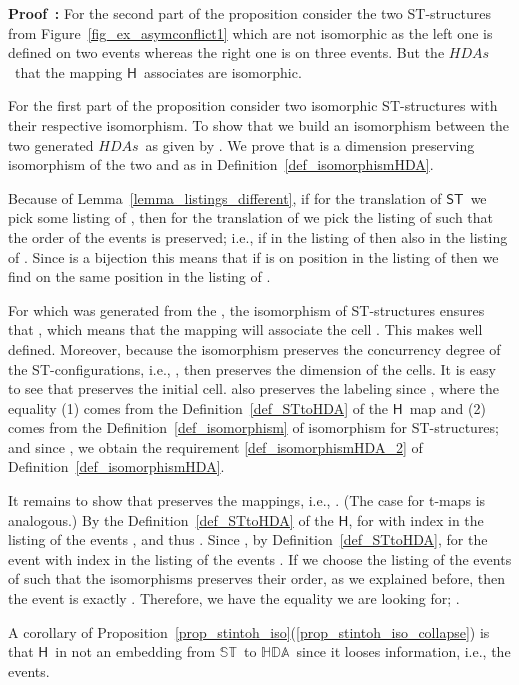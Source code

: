 \documentclass[submission,copyright,creativecommons]{eptcs}
\newenvironment{proof}[1][\!\!\,]{\vspace{1ex}\noindent\textbf{Proof #1: }}{\hfill\vspace{2ex}}
\newcommand{\refeq}[1]{(\ref{#1})}
\newcounter{case}
\newcommand\HDAs{\ensuremath{\mathit{HDAs}}}
\newcommand\ST{\ensuremath{\mathsf{ST}}}
\newcommand\allST{\ensuremath{\mathbb{ST}}}
\newcommand\allHDA{\ensuremath{\mathbb{HDA}}}
\newcommand\stintoh{\ensuremath{\mathsf{H}}}
\begin{document}
\begin{proof}
For the second part of the proposition consider the two ST-structures from Figure~\ref{fig_ex_asymconflict1} which are not isomorphic as the left one is defined on two events whereas the right one is on three events. But the \HDAs\ that the mapping \stintoh\ associates are isomorphic.

\vspace{1ex}
For the first part of the proposition consider two isomorphic ST-structures  with  their respective isomorphism. To show that  we build an isomorphism between the two generated \HDAs\ as  given by . We prove that  is a dimension preserving isomorphism of the two  and  as in Definition~\ref{def_isomorphismHDA}.

Because of Lemma~\ref{lemma_listings_different}, if for the translation of \ST\ we pick some listing of , then for the translation of  we pick the listing of  such that the order of the events is preserved; i.e., if  in the listing of  then also  in the listing of . Since  is a bijection this means that if  is on position  in the listing of  then  we find  on the same position  in the listing of .

For  which was generated from the , the isomorphism of ST-structures ensures that , which means that the mapping will associate the cell . This makes  well defined. Moreover, because the isomorphism  preserves the concurrency degree of the ST-configurations, i.e., , then  preserves the dimension of the cells.
It is easy to see that  preserves the initial cell.
 also preserves the labeling since , where the equality (1) comes from the Definition~\ref{def_STtoHDA} of the \stintoh\ map and (2) comes from the Definition~\ref{def_isomorphism} of isomorphism for ST-structures; and since , we obtain the requirement \ref{def_isomorphismHDA_2} of Definition~\ref{def_isomorphismHDA}.

It remains to show that  preserves the mappings, i.e., . (The case for t-maps is analogous.) By the Definition~\ref{def_STtoHDA} of the \stintoh,  for  with index  in the listing of the events , and thus . Since , by Definition~\ref{def_STtoHDA},  for   the event with index  in the listing of the events . If we choose the listing of the events of  such that the isomorphisms  preserves their order, as we explained before, then the event  is exactly . Therefore, we have the equality we are looking for; .
\end{proof}

A corollary of Proposition~\ref{prop_stintoh_iso}\refeq{prop_stintoh_iso_collapse} is that \stintoh\ in not an embedding from \allST\ to \allHDA\ since it looses information, i.e., the events.
\end{document}

